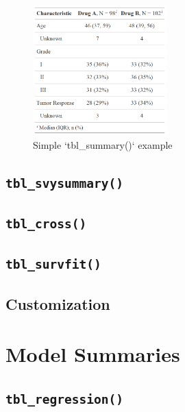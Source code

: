 \documentclass[
]{article}
\begin{document}
\begin{figure}[h!]
  \caption{Simple `tbl\_summary()` example}
  \label{fig:summary_basic}
  \includegraphics[height=5cm]{summary_basic.png}
  \centering
\end{figure}

\hypertarget{tbl_svysummary}{%
\subsection{\texorpdfstring{\texttt{tbl\_svysummary()}}{tbl\_svysummary()}}\label{tbl_svysummary}}

\hypertarget{tbl_cross}{%
\subsection{\texorpdfstring{\texttt{tbl\_cross()}}{tbl\_cross()}}\label{tbl_cross}}

\hypertarget{tbl_survfit}{%
\subsection{\texorpdfstring{\texttt{tbl\_survfit()}}{tbl\_survfit()}}\label{tbl_survfit}}

\hypertarget{customization}{%
\subsection{Customization}\label{customization}}

\hypertarget{model-summaries}{%
\section{Model Summaries}\label{model-summaries}}

\hypertarget{tbl_regression}{%
\subsection{\texorpdfstring{\texttt{tbl\_regression()}}{tbl\_regression()}}\label{tbl_regression}}
\end{document}

